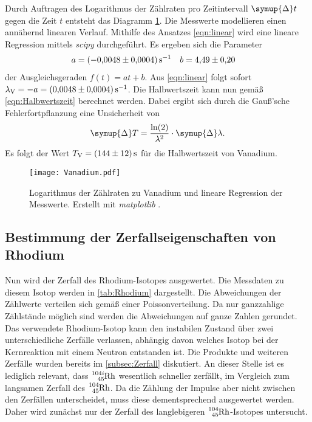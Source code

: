 Durch Auftragen des Logarithmus der Zählraten pro Zeitintervall $\symup{\Delta}t$ gegen die Zeit $t$ entsteht das Diagramm \ref{fig:Vanadium}. Die Messwerte modellieren einen 
annähernd linearen Verlauf. Mithilfe des Ansatzes \eqref{eqn:linear} wird eine lineare Regression mittels \textit{scipy} \cite{scipy} durchgeführt.
Es ergeben sich die Parameter
\begin{align*}
  a &= \qty{-0.0048+-0.0004}{\second^{-1}} & b &= \num{ 4.49+-0.20}
\end{align*}
der Ausgleichsgeraden $f(t) = at + b$. Aus \autoref{eqn:linear} folgt sofort $\lambda_\text{V} = -a = \qty{0.0048+-0.0004}{\second^{-1}}$. Die Halbwertszeit kann nun gemäß 
\autoref{eqn:Halbwertszeit} berechnet werden. Dabei ergibt sich durch die Gauß'sche Fehlerfortpflanzung eine Unsicherheit von 
\begin{equation}
  \label{eqn:delta_T}
  \symup{\Delta}T = \frac{\ln(2)}{\lambda^2} \cdot \symup{\Delta} \lambda. 
\end{equation}
Es folgt der Wert $T_\text{V} = \qty{144+-12}{\second}$ für die Halbwertszeit von Vanadium. 

\begin{figure}
  \centering
  \texttt{[image: Vanadium.pdf]}
  \caption{Logarithmus der Zählraten zu Vanadium und lineare Regression der Messwerte. Erstellt mit \textit{matplotlib} \cite{matplotlib}.}
  \label{fig:Vanadium}
\end{figure}

\subsection{Bestimmung der Zerfallseigenschaften von Rhodium}
\label{subsec:A_Rhodium}

Nun wird der Zerfall des Rhodium-Isotopes ausgewertet. Die Messdaten zu diesem Isotop werden in \autoref{tab:Rhodium} dargestellt. Die Abweichungen der Zählwerte
verteilen sich gemäß einer Poissonverteilung. Da nur ganzzahlige Zählstände möglich sind werden die Abweichungen auf ganze Zahlen gerundet. Das verwendete Rhodium-Isotop kann 
den instabilen Zustand über zwei unterschiedliche Zerfälle verlassen, abhängig davon welches Isotop bei der Kernreaktion mit einem Neutron entstanden ist. Die Produkte und
weiteren Zerfälle wurden bereits im \autoref{subsec:Zerfall} diskutiert.
An dieser Stelle ist es lediglich relevant, dass  $\ce{^{104i}_{45}Rh}$ wesentlich schneller zerfällt, im Vergleich zum langsamen Zerfall des $\ce{^{104}_{45}Rh}$.
Da die Zählung der Impulse aber nicht zwischen den Zerfällen unterscheidet, muss diese dementsprechend ausgewertet werden. Daher wird zunächst nur der 
Zerfall des langlebigeren $\ce{^{104}_{45}Rh}$-Isotopes untersucht.

